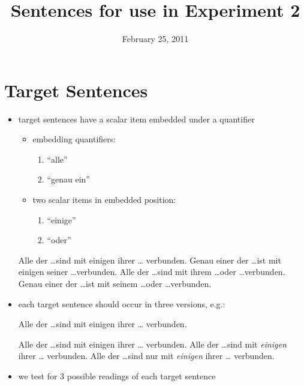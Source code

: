 \documentclass[fleqn,reqno,10pt]{article}
\title{Sentences for use in Experiment 2}
\date{February 25, 2011 }
\begin{document}
\maketitle

\section{Target Sentences}

\begin{itemize}
\item target sentences have a scalar item embedded under a quantifier
  \begin{itemize}
  \item embedding quantifiers:
    \begin{enumerate}
    \item ``alle'' 
    \item ``genau ein'' 
    \end{enumerate}
  \item two scalar items in embedded position:
    \begin{enumerate}
    \item ``einige''
    \item ``oder''
    \end{enumerate}
  \end{itemize}
  \begin{exe}
  \ex \label{bsp:target1} Alle der \dots sind  mit einigen ihrer \dots
    verbunden. \attrib{($\forall\exists$)}
  \ex Genau einer der \dots ist  mit einigen seiner \dots verbunden. \attrib{($!\exists\exists$)}
  \ex Alle der \dots sind  mit ihrem \dots oder \dots verbunden. \attrib{($\forall\vee$)}
  \ex Genau einer der \dots ist  mit seinem \dots oder \dots verbunden. \attrib{($!\exists\vee$)}
  \end{exe}
\item each target sentence should occur in three versions, e.g.:
  \begin{exe}
     Alle der \dots sind mit einigen ihrer \dots
    verbunden. \attrib{($\forall\exists$)}
    \begin{xlist}
    \ex  Alle der \dots sind mit einigen ihrer \dots
      verbunden. 
    \ex Alle der \dots sind mit \emph{einigen} ihrer \dots
      verbunden. 
    \ex Alle der \dots sind nur mit \emph{einigen} ihrer \dots
      verbunden. 
    \end{xlist}
  \end{exe}
\item we test for 3 possible readings of each target sentence
\end{itemize}
\end{document}
